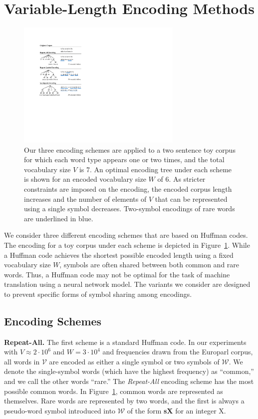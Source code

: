 \section{Variable-Length Encoding Methods}
\label{sec:encoding}

\begin{figure}
\includegraphics[width=3.1in]{examples}
\caption{Our three encoding schemes are applied to a two sentence toy corpus
for which each word type appears one or two times, and the total vocabulary
size $V$ is 7. An optimal encoding tree under each scheme is shown for an
encoded vocabulary size $W$ of 6. As stricter constraints are imposed on the
encoding, the encoded corpus length increases and the number of elements of $V$
that can be represented using a single symbol decreases. Two-symbol encodings
of rare words are underlined in blue.}
\label{fig:examples}
\end{figure}

We consider three different encoding schemes that are based on Huffman codes.
The encoding for a toy corpus under each scheme is depicted in
Figure~\ref{fig:examples}. While a Huffman code achieves the shortest possible
encoded length using a fixed vocabulary size $W$, symbols are often shared
between both common and rare words. Thus, a Huffman code may not be optimal for
the task of machine translation using a neural network model. The variants we
consider are designed to prevent specific forms of symbol sharing among
encodings.

\subsection{Encoding Schemes}

\noindent\textbf{Repeat-All.}
The first scheme is a standard Huffman code. In our experiments with
$V\approx2\cdot10^6$ and $W=3\cdot10^4$ and frequencies drawn from the Europarl
corpus, all words in $\mathcal{V}$ are encoded as either a single symbol or two
symbols of $\mathcal{W}$. We denote the single-symbol words (which have the
highest frequency) as ``common,'' and we call the other words ``rare.'' The
\emph{Repeat-All} encoding scheme has the most possible common words. In
Figure~\ref{fig:examples}, common words are represented as themselves. Rare
words are represented by two words, and the first is always a pseudo-word
symbol introduced into $\mathcal{W}$ of the form \textbf{sX} for an integer X.

